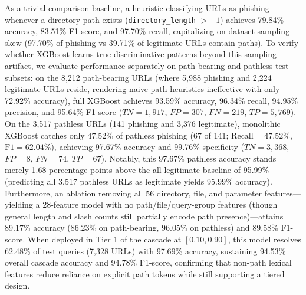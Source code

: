As a trivial comparison baseline, a heuristic classifying URLs as phishing whenever a directory path exists (\texttt{directory\_length} $> -1$) achieves 79.84\% accuracy, 83.51\% F1-score, and 97.70\% recall, capitalizing on dataset sampling skew (97.70\% of phishing vs 39.71\% of legitimate URLs contain paths). To verify whether XGBoost learns true discriminative patterns beyond this sampling artifact, we evaluate performance separately on path-bearing and pathless test subsets: on the 8,212 path-bearing URLs (where 5,988 phishing and 2,224 legitimate URLs reside, rendering naive path heuristics ineffective with only 72.92\% accuracy), full XGBoost achieves 93.59\% accuracy, 96.34\% recall, 94.95\% precision, and 95.64\% F1-score ($TN=1,917$, $FP=307$, $FN=219$, $TP=5,769$). On the 3,517 pathless URLs (141 phishing and 3,376 legitimate), monolithic XGBoost catches only 47.52\% of pathless phishing (67 of 141; $\text{Recall} = 47.52\%$, $\text{F1} = 62.04\%$), achieving 97.67\% accuracy and 99.76\% specificity ($TN=3,368$, $FP=8$, $FN=74$, $TP=67$). Notably, this 97.67\% pathless accuracy stands merely 1.68 percentage points above the all-legitimate baseline of 95.99\% (predicting all 3,517 pathless URLs as legitimate yields 95.99\% accuracy). Furthermore, an ablation removing all 56 directory, file, and parameter features—yielding a 28-feature model with no path/file/query-group features (though general length and slash counts still partially encode path presence)—attains 89.17\% accuracy (86.23\% on path-bearing, 96.05\% on pathless) and 89.58\% F1-score. When deployed in Tier 1 of the cascade at $[0.10, 0.90]$, this model resolves 62.48\% of test queries (7,328 URLs) with 97.69\% accuracy, sustaining 94.53\% overall cascade accuracy and 94.78\% F1-score, confirming that non-path lexical features reduce reliance on explicit path tokens while still supporting a tiered design.

